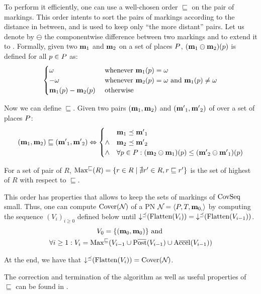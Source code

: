 To perform it efficiently, one can use a well-chosen order $\sqsubseteq$ on the pair of markings.
This order intents to sort the pairs of markings according to the distance in between, and is used to keep only ``the more distant'' pairs.
Let us denote by $\ominus$ the componentwise difference between two markings and to extend it to \omarks.
Formally, given two \omarks $\mathbf{m}_1$ and $\mathbf{m}_2$ on a set of places $P$, $(\mathbf{m}_1 \ominus \mathbf{m}_2)(p)$ is defined for all $p \in P$ as:
\[
  \begin{cases}
    \omega & \text{ whenever } \mathbf{m}_1(p) = \omega \\
    -\omega & \text{ whenever } \mathbf{m}_2(p) = \omega \text{ and } \mathbf{m}_1(p) \neq \omega \\
    \mathbf{m}_1(p) - \mathbf{m}_2(p) & \text{ otherwise}
  \end{cases}
\]

Now we can define $\sqsubseteq$.
Given two pairs $(\mathbf{m}_1, \mathbf{m}_2)$ and $(\mathbf{m'}_1, \mathbf{m'}_2)$ of \omarks over a set of places $P$:
\[
  (\mathbf{m}_1, \mathbf{m}_2) \sqsubseteq (\mathbf{m'}_1, \mathbf{m'}_2) \Leftrightarrow
  \begin{cases}
    & \mathbf{m}_1 \preceq \mathbf{m'}_1 \\
    \wedge & \mathbf{m}_2 \preceq \mathbf{m'}_2 \\
    \wedge & \forall p \in P : (\mathbf{m}_2 \ominus \mathbf{m}_1)(p) \leq (\mathbf{m'}_2 \ominus \mathbf{m'}_1)(p)
  \end{cases}
\]

For a set of pair of \omarks $R$, $\operatorname{Max^\sqsubseteq}(R) = \{ r \in R \mid \nexists r' \in R, r \sqsubseteq r'\}$ is the set of highest \omark of $R$ with respect to $\sqsubseteq$.

This order has properties \citep{Geeraerts07} that allows to keep the sets of markings of $\operatorname{CovSeq}$ small.
Thus, one can compute $\operatorname{Cover}(\mathcal{N}_{})$ of a \ac{PN} $\mathcal{N}_{} = \left\langle P_{}, T_{}, \mathbf{m}_{0,}\right\rangle$ by computing the sequence $(V_i)_{i \geq 0}$ defined below until $\operatorname{\downarrow^\preceq}(\operatorname{Flatten}(V_i)) = \operatorname{\downarrow^\preceq}(\operatorname{Flatten}(V_{i-1}))$.
\begin{gather*}
  V_0 = \{(\mari, \mari)\} \text{ and } \\
  \forall i \geq 1 : V_i = \maxs{V_{i-1} \cup \Postb(V_{i-1}) \cup \Accelb(V_{i-1})}
\end{gather*}

At the end, we have that $\operatorname{\downarrow^\preceq}(\operatorname{Flatten}(V_i)) = \operatorname{Cover}(\mathcal{N}_{})$.

The correction and termination of the algorithm as well as useful properties of $\sqsubseteq$ can be found in \cite{Geeraerts07, Ganty09}.


